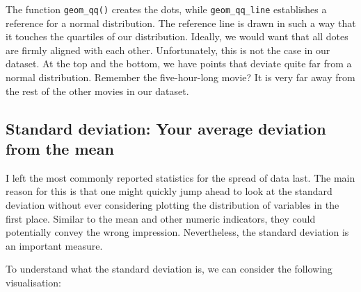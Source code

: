 \documentclass[
  letterpaper,
]{krantz}
\makeatletter
\newenvironment{Shaded}{\begin{snugshade}}{\end{snugshade}}
\newcommand{\AttributeTok}[1]{\textcolor[rgb]{0.40,0.45,0.13}{#1}}
\newcommand{\CommentTok}[1]{\textcolor[rgb]{0.37,0.37,0.37}{#1}}
\newcommand{\ConstantTok}[1]{\textcolor[rgb]{0.56,0.35,0.01}{#1}}
\newcommand{\FunctionTok}[1]{\textcolor[rgb]{0.28,0.35,0.67}{#1}}
\newcommand{\NormalTok}[1]{\textcolor[rgb]{0.00,0.23,0.31}{#1}}
\newcommand{\OtherTok}[1]{\textcolor[rgb]{0.00,0.23,0.31}{#1}}
\newcommand{\SpecialCharTok}[1]{\textcolor[rgb]{0.37,0.37,0.37}{#1}}
\newcommand{\StringTok}[1]{\textcolor[rgb]{0.13,0.47,0.30}{#1}}
\newenvironment{kframe}{%
\medskip{}
\setlength{\fboxsep}{.8em}
 \def\at@end@of@kframe{}%
 \ifinner\ifhmode%
  \def\at@end@of@kframe{\end{minipage}}%
  \begin{minipage}{\columnwidth}%
 \fi\fi%
 \def\FrameCommand##1{\hskip\@totalleftmargin \hskip-\fboxsep
 \colorbox{shadecolor}{##1}\hskip-\fboxsep
     \hskip-\linewidth \hskip-\@totalleftmargin \hskip\columnwidth}%
 \MakeFramed {\advance\hsize-\width
   \@totalleftmargin\z@ \linewidth\hsize
   \@setminipage}}%
 {\par\unskip\endMakeFramed%
 \at@end@of@kframe}
\renewenvironment{Shaded}{\begin{kframe}}{\end{kframe}}
\makeatother
\begin{document}
The function \texttt{geom\_qq()} creates the dots, while
\texttt{geom\_qq\_line} establishes a reference for a normal
distribution. The reference line is drawn in such a way that it touches
the quartiles of our distribution. Ideally, we would want that all dotes
are firmly aligned with each other. Unfortunately, this is not the case
in our dataset. At the top and the bottom, we have points that deviate
quite far from a normal distribution. Remember the five-hour-long movie?
It is very far away from the rest of the other movies in our dataset.

\subsection{Standard deviation: Your average deviation from the
mean}\label{sec-standard-deviation}

I left the most commonly reported statistics for the spread of data
last. The main reason for this is that one might quickly jump ahead to
look at the standard deviation without ever considering plotting the
distribution of variables in the first place. Similar to the mean and
other numeric indicators, they could potentially convey the wrong
impression. Nevertheless, the standard deviation is an important
measure.

To understand what the standard deviation is, we can consider the
following visualisation:

\begin{Shaded}
\end{Shaded}
\end{document}
